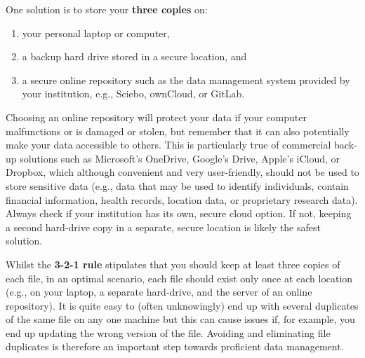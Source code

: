 \documentclass[
  letterpaper,
  DIV=11,
  numbers=noendperiod]{scrreprt}
\providecommand{\tightlist}{%
  \setlength{\itemsep}{0pt}\setlength{\parskip}{0pt}}\usepackage{longtable,booktabs,array}
\begin{document}
One solution is to store your \textbf{three copies} on:

\begin{enumerate}
\def\labelenumi{\arabic{enumi}.}
\tightlist
\item
  your personal laptop or computer,
\item
  a backup hard drive stored in a secure location, and
\item
  a secure online repository such as the data management system provided
  by your institution, e.g., Sciebo, ownCloud, or GitLab.
\end{enumerate}

Choosing an online repository will protect your data if your computer
malfunctions or is damaged or stolen, but remember that it can also
potentially make your data accessible to others. This is particularly
true of commercial back-up solutions such as Microsoft's OneDrive,
Google's Drive, Apple's iCloud, or Dropbox, which although convenient
and very user-friendly, should not be used to store sensitive data
(e.g., data that may be used to identify individuals, contain financial
information, health records, location data, or proprietary research
data). Always check if your institution has its own, secure cloud
option. If not, keeping a second hard-drive copy in a separate, secure
location is likely the safest solution.

Whilst the \textbf{3-2-1 rule} stipulates that you should keep at least
three copies of each file, in an optimal scenario, each file should
exist only once at each location (e.g., on your laptop, a separate
hard-drive, and the server of an online repository). It is quite easy to
(often unknowingly) end up with several duplicates of the same file on
any one machine but this can cause issues if, for example, you end up
updating the wrong version of the file. Avoiding and eliminating file
duplicates is therefore an important step towards proficient data
management.
\end{document}
